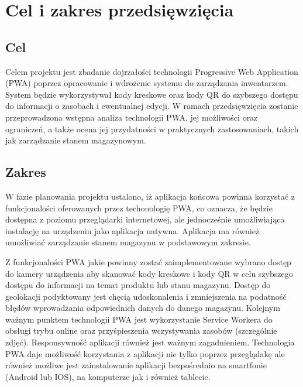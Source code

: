 \documentclass[../main.tex]{subfiles}
\begin{document}
\section{Cel i zakres przedsięwzięcia}
    \subsection{Cel}    
    Celem projektu jest zbadanie dojrzałości technologii Progressive Web Application (PWA) poprzez opracowanie i wdrożenie systemu do zarządzania inwentarzem. System będzie wykorzystywał kody kreskowe oraz kody QR do szybszego dostępu do informacji o zasobach i ewentualnej edycji. W ramach przedsięwzięcia zostanie przeprowadzona wstępna analiza technologii PWA, jej możliwości oraz ograniczeń, a także ocena jej przydatności w praktycznych zastosowaniach, takich jak zarządzanie stanem magazynowym.
        

    \subsection{Zakres}
        W fazie planowania projektu ustalono, iż aplikacja końcowa powinna korzystać z funkcjonalości oferowanych przez techonologię PWA, co oznacza, że będzie dostępna z poziomu przeglądarki internetowej, ale jednocześnie umożliwiająca instalację na urządzeniu jako aplikacja natywna. Aplikacja ma również umożliwiać zarządzanie stanem magazynu w podstawowym zakresie. 

        Z funkcjonalości PWA jakie powinny zostać zaimplementowane wybrano dostęp do kamery urządzenia aby skanować kody kreskowe i kody QR w celu szybszego dostępu do informacji na temat produktu lub stanu magazynu. Dostęp do geolokacji podyktowany jest chęcią udoskonalenia i zmniejszenia na podatność błędów wprowadzania odpowiednich danych do danego magazynu. Kolejnym ważnym punktem technologii PWA jest wykorzystanie Service Workera do obsługi trybu online oraz przyśpieszenia wczystywania zasobów (szczególnie zdjęć). Responsywność aplikacji również jest ważnym zagadnieniem. Technologia PWA daje możliwość korzystania z aplikacji nie tylko poprzez przeglądakę ale również możliwe jest zainstalowanie aplikacji bezpośrednio na smartfonie (Android lub IOS), na komputerze jak i również tablecie. 
\end{document}
